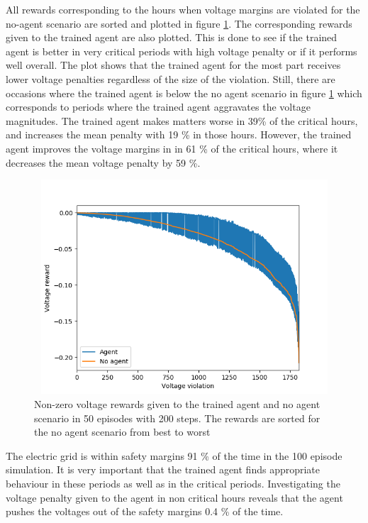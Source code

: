 \documentclass[class=book, crop=false]{standalone}
\begin{document}
All rewards corresponding to the hours when voltage margins are violated for the no-agent scenario are sorted and plotted in figure \ref{fig:results:config1_sorted_voltage}. The corresponding rewards given to the trained agent are also plotted. This is done to see if the trained agent is better in very critical periods with high voltage penalty or if it performs well overall. The plot shows that the trained agent for the most part receives lower voltage penalties regardless of the size of the violation. Still, there are occasions where the trained agent is below the no agent scenario in figure \ref{fig:results:config1_sorted_voltage} which corresponds to periods where the trained agent aggravates the voltage magnitudes. The trained agent makes matters worse in 39\% of the critical hours, and increases the mean penalty with 19 \% in those hours. However, the trained agent improves the voltage margins in in 61 \% of the critical hours, where it decreases the mean voltage penalty by 59 \%.



\begin{figure}[ht]
    \center
\includegraphics[height=8cm, width=12cm]{figures/config1_sorted_voltage.png}
    \caption[size = 9]{Non-zero voltage rewards given to the trained agent and no agent scenario in 50 episodes with 200 steps. The rewards are sorted for the no agent scenario from best to worst}
    \label{fig:results:config1_sorted_voltage}
\end{figure}


The electric grid is within safety margins 91 \% of the time in the 100 episode simulation. It is very important that the trained agent finds appropriate behaviour in these periods as well as in the critical periods. Investigating the voltage penalty given to the agent in non critical hours reveals that the agent pushes the voltages out of the safety margins 0.4 \% of the time.
\end{document}
